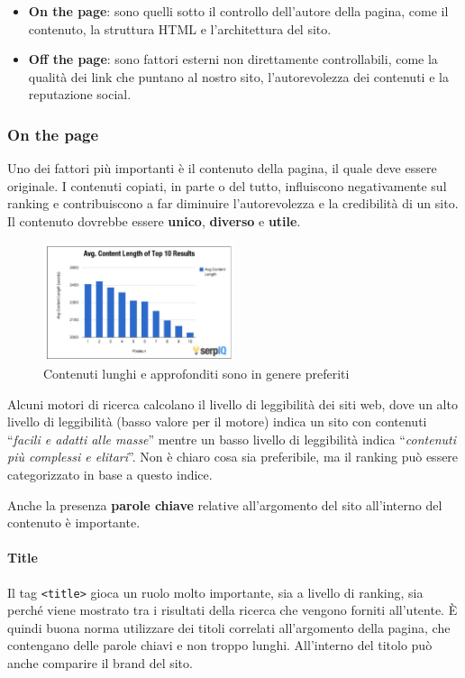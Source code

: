 \begin{itemize}
	\item \textbf{On the page}: sono quelli sotto il controllo dell'autore della pagina, come il contenuto, la struttura HTML e l'architettura del sito.
	\item \textbf{Off the page}: sono fattori esterni non direttamente controllabili, come la qualità dei link che puntano al nostro sito, l'autorevolezza dei contenuti e la reputazione social.
\end{itemize}

\subsubsection{On the page}

Uno dei fattori più importanti è il contenuto della pagina, il quale deve essere originale. 
I contenuti copiati, in parte o del tutto, influiscono negativamente sul ranking e contribuiscono a far diminuire l'autorevolezza e la credibilità di un sito. Il contenuto dovrebbe essere \textbf{unico}, \textbf{diverso} e \textbf{utile}.

\begin{figure}[htbp]
	\centering
	\includegraphics[width = 0.5\textwidth]{images/l23-fig-1}
	\caption{Contenuti lunghi e approfonditi sono in genere preferiti}
\end{figure}

Alcuni motori di ricerca calcolano il livello di leggibilità dei siti web, dove un alto livello di leggibilità (basso valore per il motore) indica un sito con contenuti ``\textit{facili e adatti alle masse}'' mentre un basso livello di leggibilità indica ``\textit{contenuti più complessi e elitari}''.
Non è chiaro cosa sia preferibile, ma il ranking può essere categorizzato in base a questo indice.

Anche la presenza \textbf{parole chiave} relative all'argomento del sito all'interno del contenuto è importante.

\paragraph{Title} Il tag \texttt{<title>} gioca un ruolo molto importante, sia a livello di ranking, sia perché viene mostrato tra i risultati della ricerca che vengono forniti all'utente.
\`E quindi buona norma utilizzare dei titoli correlati all'argomento della pagina, che contengano delle parole chiavi e non troppo lunghi. All'interno del titolo può anche comparire il brand del sito.

